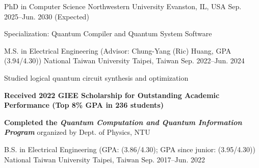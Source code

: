 

\begin{cventries}

    \cventry
    {PhD in Computer Science}
    {Northwestern University}
    {Evanston, IL, USA}
    {Sep. 2025--Jun. 2030 (Expected)}
    {
        \begin{cvitems}
            \item Specialization: Quantum Compiler and Quantum System Software
        \end{cvitems}
    }
    
    \cventry
    {M.S. in Electrical Engineering (Advisor: Chung-Yang (Ric) Huang, GPA (3.94/4.30))}
    {National Taiwan University}
    {Taipei, Taiwan}
    {Sep. 2022--Jun. 2024}
    {
        \begin{cvitems}
            \item Studied logical quantum circuit synthesis and optimization
            \item \textcolor{awesome}{\textbf{Received 2022 GIEE Scholarship for Outstanding Academic Performance (Top 8\% GPA in 236 students)}}
            \item \textcolor{awesome}{\textbf{Completed the \emph{Quantum Computation and Quantum Information Program}}} organized by Dept. of Physics, NTU
        \end{cvitems}
    }
    
    \cventry
    {B.S. in Electrical Engineering (GPA: (3.86/4.30); GPA since junior: (3.95/4.30))} %
    {National Taiwan University} %
    {Taipei, Taiwan} %
    {Sep. 2017--Jun. 2022} %
    {}
\end{cventries}
